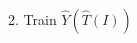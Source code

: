 \documentclass[preview]{standalone}
\begin{document}
\begin{center}
2. Train $\hat{Y}(\hat{T}(I))$
\end{center}
\end{document}
